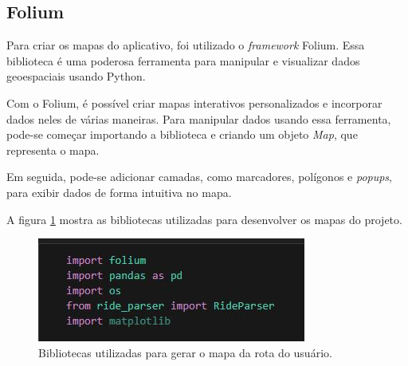     \subsection{Folium}

    
    

 Para criar os mapas do aplicativo, foi utilizado o \textit{framework} Folium. Essa biblioteca é uma poderosa ferramenta para manipular e visualizar dados geoespaciais usando Python. 
    
    Com o Folium, é possível criar mapas interativos personalizados e incorporar dados neles de várias maneiras. Para manipular dados usando essa ferramenta, pode-se começar importando a biblioteca e criando um objeto \textit{Map}, que representa o mapa. 
    
    Em seguida, pode-se adicionar camadas, como marcadores, polígonos e \textit{popups}, para exibir dados de forma intuitiva no mapa. 
    
    
    A figura 
    \ref{fig:python_libs} mostra as bibliotecas utilizadas para desenvolver os mapas do projeto.
    
    \begin{figure}[hp]
        \centering
        
        \includegraphics[scale=0.8]{figures/bibliotecas.jpg}
        
        \caption{Bibliotecas utilizadas para gerar o mapa da rota do usuário.}
        
        \label{fig:python_libs}
    \end{figure}
    
            
